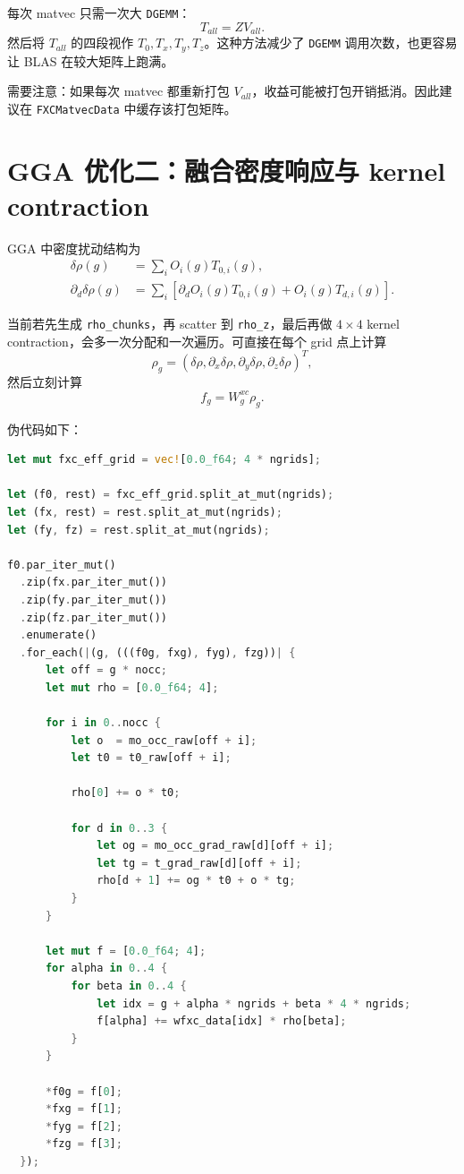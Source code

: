 \documentclass[11pt,a4paper]{ctexart}
\begin{document}
每次 matvec 只需一次大 \texttt{DGEMM}：
\begin{equation}
  T_{all}=ZV_{all}.
\end{equation}
然后将 $T_{all}$ 的四段视作 $T_0,T_x,T_y,T_z$。这种方法减少了 \texttt{DGEMM} 调用次数，也更容易让 BLAS 在较大矩阵上跑满。

需要注意：如果每次 matvec 都重新打包 $V_{all}$，收益可能被打包开销抵消。因此建议在 \texttt{FXCMatvecData} 中缓存该打包矩阵。

\section{GGA 优化二：融合密度响应与 kernel contraction}

GGA 中密度扰动结构为
\begin{align}
  \delta \rho(g)
  &= \sum_i O_i(g) T_{0,i}(g),\\
  \partial_d \delta\rho(g)
  &= \sum_i \left[\partial_d O_i(g)T_{0,i}(g)+O_i(g)T_{d,i}(g)\right].
\end{align}

当前若先生成 \texttt{rho\_chunks}，再 scatter 到 \texttt{rho\_z}，最后再做 $4\times 4$ kernel contraction，会多一次分配和一次遍历。可直接在每个 grid 点上计算
\begin{equation}
  \rho_g = (\delta\rho,\partial_x\delta\rho,\partial_y\delta\rho,\partial_z\delta\rho)^T,
\end{equation}
然后立刻计算
\begin{equation}
  f_g = W^{xc}_g \rho_g.
\end{equation}

伪代码如下：

\begin{lstlisting}[language=Rust,style=code]
let mut fxc_eff_grid = vec![0.0_f64; 4 * ngrids];

let (f0, rest) = fxc_eff_grid.split_at_mut(ngrids);
let (fx, rest) = rest.split_at_mut(ngrids);
let (fy, fz) = rest.split_at_mut(ngrids);

f0.par_iter_mut()
  .zip(fx.par_iter_mut())
  .zip(fy.par_iter_mut())
  .zip(fz.par_iter_mut())
  .enumerate()
  .for_each(|(g, (((f0g, fxg), fyg), fzg))| {
      let off = g * nocc;
      let mut rho = [0.0_f64; 4];

      for i in 0..nocc {
          let o  = mo_occ_raw[off + i];
          let t0 = t0_raw[off + i];

          rho[0] += o * t0;

          for d in 0..3 {
              let og = mo_occ_grad_raw[d][off + i];
              let tg = t_grad_raw[d][off + i];
              rho[d + 1] += og * t0 + o * tg;
          }
      }

      let mut f = [0.0_f64; 4];
      for alpha in 0..4 {
          for beta in 0..4 {
              let idx = g + alpha * ngrids + beta * 4 * ngrids;
              f[alpha] += wfxc_data[idx] * rho[beta];
          }
      }

      *f0g = f[0];
      *fxg = f[1];
      *fyg = f[2];
      *fzg = f[3];
  });
\end{lstlisting}
\end{document}
